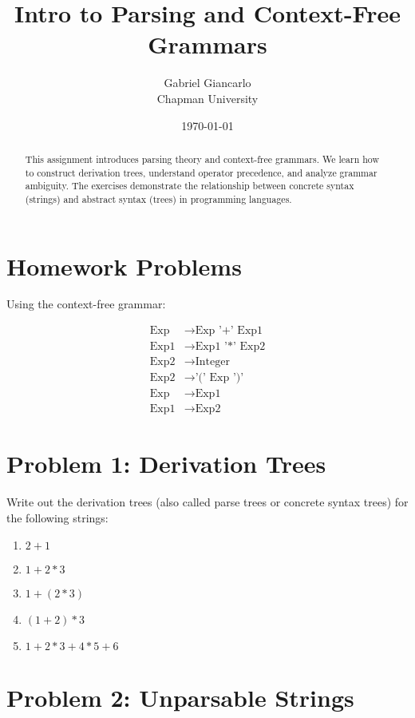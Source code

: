\documentclass{article}
\title{Intro to Parsing and Context-Free Grammars}
\author{Gabriel Giancarlo \\ Chapman University}
\date{\today}
\theoremstyle{plain}
\theoremstyle{definition}
\theoremstyle{remark}
\begin{document}
\maketitle

\begin{abstract}
This assignment introduces parsing theory and context-free grammars. We learn how to construct derivation trees, understand operator precedence, and analyze grammar ambiguity. The exercises demonstrate the relationship between concrete syntax (strings) and abstract syntax (trees) in programming languages.
\end{abstract}

\section{Homework Problems}

Using the context-free grammar:

\begin{align}
\text{Exp} &\to \text{Exp '+' Exp1} \\
\text{Exp1} &\to \text{Exp1 '*' Exp2} \\
\text{Exp2} &\to \text{Integer} \\
\text{Exp2} &\to \text{'(' Exp ')'} \\
\text{Exp} &\to \text{Exp1} \\
\text{Exp1} &\to \text{Exp2}
\end{align}

\section{Problem 1: Derivation Trees}

Write out the derivation trees (also called parse trees or concrete syntax trees) for the following strings:

\begin{enumerate}[label=(\alph*)]
    \item $2+1$
    \item $1+2*3$
    \item $1+(2*3)$
    \item $(1+2)*3$
    \item $1+2*3+4*5+6$
\end{enumerate}

\section{Problem 2: Unparsable Strings}
\end{document}
